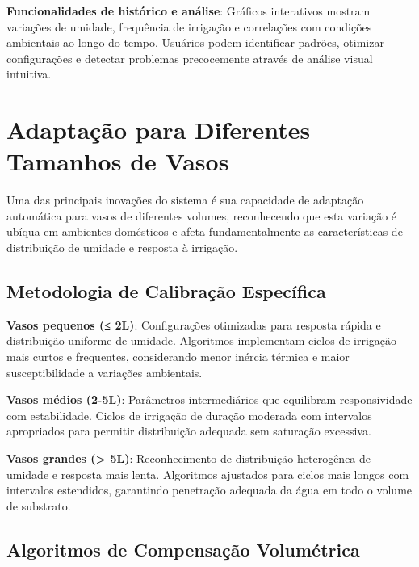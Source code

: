 \textbf{Funcionalidades de histórico e análise}: Gráficos interativos mostram variações de umidade, frequência de irrigação e correlações com condições ambientais ao longo do tempo. Usuários podem identificar padrões, otimizar configurações e detectar problemas precocemente através de análise visual intuitiva.

\section{Adaptação para Diferentes Tamanhos de Vasos}

Uma das principais inovações do sistema é sua capacidade de adaptação automática para vasos de diferentes volumes, reconhecendo que esta variação é ubíqua em ambientes domésticos e afeta fundamentalmente as características de distribuição de umidade e resposta à irrigação.

\subsection{Metodologia de Calibração Específica}

\textbf{Vasos pequenos (≤ 2L)}: Configurações otimizadas para resposta rápida e distribuição uniforme de umidade. Algoritmos implementam ciclos de irrigação mais curtos e frequentes, considerando menor inércia térmica e maior susceptibilidade a variações ambientais.

\textbf{Vasos médios (2-5L)}: Parâmetros intermediários que equilibram responsividade com estabilidade. Ciclos de irrigação de duração moderada com intervalos apropriados para permitir distribuição adequada sem saturação excessiva.

\textbf{Vasos grandes (> 5L)}: Reconhecimento de distribuição heterogênea de umidade e resposta mais lenta. Algoritmos ajustados para ciclos mais longos com intervalos estendidos, garantindo penetração adequada da água em todo o volume de substrato.


\subsection{Algoritmos de Compensação Volumétrica}

